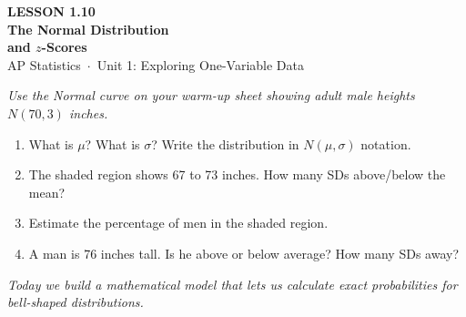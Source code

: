 \documentclass[aspectratio=169, 11pt]{beamer}
\begin{document}
{
\begin{frame}[plain]
  \vspace{2.8cm}
  \hspace{0.55cm}%
  \begin{minipage}{0.9\textwidth}
    {\color{goldacc}\bfseries\small LESSON 1.10}\\[0.5cm]
    {\color{white}\bfseries\LARGE The Normal Distribution\\[0.25cm]
      and $z$-Scores}\\[1.4cm]
    {\color{skymid}\small AP Statistics~$\cdot$~Unit 1: Exploring One-Variable Data}
  \end{minipage}
\end{frame}
}

{
\begin{frame}[t, plain]
  \vspace{1em}%
  \hspace{0.55cm}%
  \begin{minipage}{0.9\textwidth}
    \small
    \textit{Use the Normal curve on your warm-up sheet showing adult male heights
    $N(70, 3)$ inches.}

    \vspace{0.5em}
    \begin{enumerate}
      \setlength{\itemsep}{0.6em}\setlength{\topsep}{0em}
      \item What is $\mu$? What is $\sigma$? Write the distribution in $N(\mu,\sigma)$ notation.
      \item The shaded region shows 67 to 73 inches. How many SDs above/below the mean?
      \item Estimate the percentage of men in the shaded region.
      \item A man is 76 inches tall. Is he above or below average? How many SDs away?
    \end{enumerate}
    \vspace{0.4cm}
    {\color{navy}\itshape\small
      Today we build a mathematical model that lets us calculate exact
      probabilities for bell-shaped distributions.}
  \end{minipage}
\end{frame}
}
\end{document}
